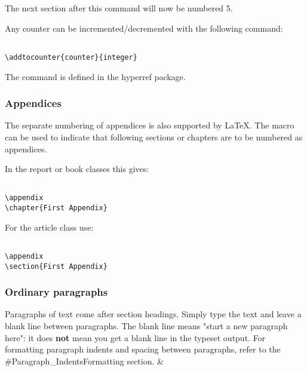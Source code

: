 The next section after this command will now be numbered 5.

Any counter can be incremented/decremented with the following command:

\begin{lstlisting}

\addtocounter{counter}{integer}

\end{lstlisting}


The  command is defined in the hyperref package.

\subsubsection{ Appendices }
The separate numbering of appendices is also supported by LaTeX. The \texttt{\appendix} macro can be used to indicate that following sections or chapters are to be numbered as appendices.

In the report or book classes this gives:

\begin{lstlisting}

\appendix
\chapter{First Appendix}

\end{lstlisting}


For the article class use:

\begin{lstlisting}

\appendix
\section{First Appendix}

\end{lstlisting}


\subsubsection{ Ordinary paragraphs }
Paragraphs of text come after section headings. Simply type the text and leave a blank line between paragraphs. The blank line means "start a new paragraph here": it does \textbf{not} mean you get a blank line in the typeset output. For formatting paragraph indents and spacing between paragraphs, refer to the #Paragraph\_IndentsFormatting section. &

